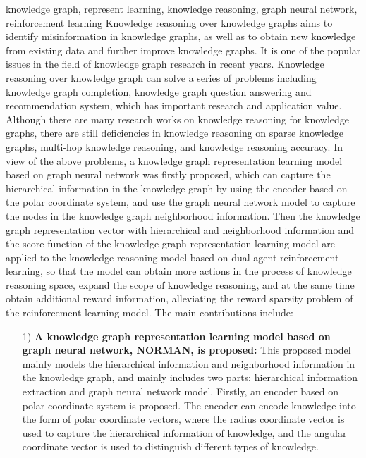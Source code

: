\documentclass[algorithmlist, AutoFakeBold, AutoFakeSlant, figurelist, tablelist, nomlist, engineering, openany]{seuthesix} %
\begin{document}
\begin{englishabstract}{knowledge graph, represent learning, knowledge reasoning, graph neural network, reinforcement learning}
  Knowledge reasoning over knowledge graphs aims to identify misinformation in knowledge graphs, as well as to obtain new knowledge from existing data and further improve knowledge graphs. It is one of the popular issues in the field of knowledge graph research in recent years.
  Knowledge reasoning over knowledge graph can solve a series of problems including knowledge graph completion, knowledge graph question answering and recommendation system, which has important research and application value.
  Although there are many research works on knowledge reasoning for knowledge graphs, there are still deficiencies in knowledge reasoning on sparse knowledge graphs, multi-hop knowledge reasoning, and knowledge reasoning accuracy.
  In view of the above problems, a knowledge graph representation learning model based on graph neural network was firstly proposed, which can capture the hierarchical information in the knowledge graph by using the encoder based on the polar coordinate system, and use the graph neural network model to capture the nodes in the knowledge graph neighborhood information.
  Then the knowledge graph representation vector with hierarchical and neighborhood information and the score function of the knowledge graph representation learning model are applied to the knowledge reasoning model based on dual-agent reinforcement learning, so that the model can obtain more actions in the process of knowledge reasoning space, expand the scope of knowledge reasoning, and at the same time obtain additional reward information, alleviating the reward sparsity problem of the reinforcement learning model.
  The main contributions include:
  \begin{itemize}
    \item [1)]\textbf{A knowledge graph representation learning model based on graph neural network, NORMAN, is proposed:}
    This proposed model mainly models the hierarchical information and neighborhood information in the knowledge graph, and mainly includes two parts: hierarchical information extraction and graph neural network model.
    Firstly, an encoder based on polar coordinate system is proposed. The encoder can encode knowledge into the form of polar coordinate vectors, where the radius coordinate vector is used to capture the hierarchical information of knowledge, and the angular coordinate vector is used to distinguish different types of knowledge.

\end{itemize}
\end{englishabstract}
\end{document}
